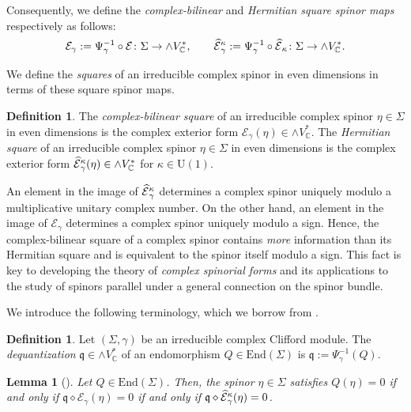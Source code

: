 \documentclass[10pt,a4paper,twoside,reqno]{amsart}
\theoremstyle{plain}
\newtheorem{lemma}[thm]{Lemma}
\theoremstyle{definition}
\newtheorem{definition}[thm]{Definition}
\theoremstyle{remark}
\newcommand{\End}{\mathrm{End}}
\def\C{\mathbb{C}}
\def\frq{\mathfrak{q}}
\def\U{\mathrm{U}}
\def\cE{\mathcal{E}}
\def\hcE{\smash{\widehat{\mathcal{E}}}}
\begin{document}
Consequently, we define the \emph{complex-bilinear} and \emph{Hermitian square spinor maps} respectively as follows: $$\cE_\gamma:=\Psi_\gamma^{-1}\circ\cE\colon\Sigma\to\wedge V^*_\C,\qquad \hcE_\gamma^\kappa:=\Psi_\gamma^{-1}\circ\hcE_\kappa\colon\Sigma\to\wedge V^*_\C.$$

We define the \emph{squares} of an irreducible complex spinor in even dimensions in terms of these square spinor maps.

\begin{definition}\label{def:squares}
    The \emph{complex-bilinear square} of an irreducible complex spinor $\eta \in \Sigma$ in even dimensions is the complex exterior form $\cE_\gamma(\eta)\in \wedge V^*_{\mathbb{C}}$. The \emph{Hermitian square} of an irreducible complex spinor $\eta \in \Sigma$ in even dimensions is the complex exterior form $\hcE_\gamma^\kappa(\eta)\in \wedge V^*_{\mathbb{C}}$ for $\kappa\in\U(1)$.
\end{definition}

An element in the image of $\hcE_\gamma^\kappa$ determines a complex spinor uniquely modulo a multiplicative unitary complex number. On the other hand, an element in the image of $\cE_\gamma$ determines a complex spinor uniquely modulo a sign. Hence, the complex-bilinear square of a complex spinor contains \emph{more} information than its Hermitian square and is equivalent to the spinor itself modulo a sign. This fact is key to developing the theory of \emph{complex spinorial forms} and its applications to the study of spinors parallel under a general connection on the spinor bundle.\medskip

We introduce the following terminology, which we borrow from \cite{Mei13}.

\begin{definition}
    Let $(\Sigma,\gamma)$ be an irreducible complex Clifford module. The \emph{dequantization} $\frq \in \wedge V^{\ast}_{\C}$ of an endomorphism $Q\in \End(\Sigma)$ is $\frq := \Psi_{\gamma}^{-1}(Q)$.
\end{definition}

\begin{lemma}[{\cite[Lemma 3.8]{Algebraic_Complex_Square_2025}}]\label{lemma:constrainedspinoreven}
    Let $Q\in \End(\Sigma)$. Then, the spinor $\eta\in \Sigma$ satisfies $Q(\eta) = 0$ if and only if $\frq\diamond \cE_{\gamma}(\eta) = 0$ if and only if $\frq\diamond \hcE^{\kappa}_{\gamma}(\eta) = 0$.
\end{lemma}
\end{document}
